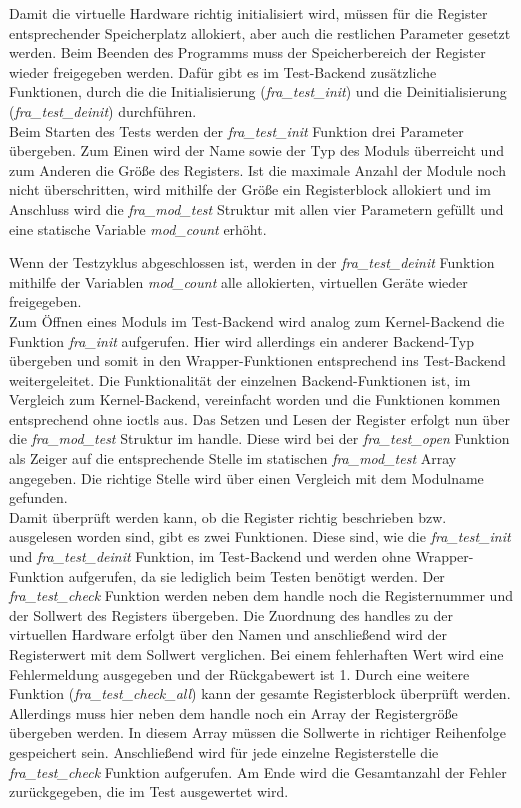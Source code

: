 Damit die virtuelle Hardware richtig initialisiert wird, müssen für die Register entsprechender Speicherplatz allokiert, aber auch die restlichen Parameter gesetzt werden. Beim Beenden des Programms muss der Speicherbereich der Register wieder freigegeben werden. Dafür gibt es im Test-Backend zusätzliche Funktionen, durch die die Initialisierung (\textit{fra\_test\_init}) und die Deinitialisierung (\textit{fra\_test\_deinit}) durchführen.\\

 
Beim Starten des Tests werden der \textit{fra\_test\_init} Funktion drei Parameter übergeben. Zum Einen wird der Name sowie der Typ des Moduls überreicht und zum Anderen die Größe des Registers. Ist die maximale Anzahl der Module noch nicht überschritten, wird mithilfe der Größe ein Registerblock allokiert und im Anschluss wird die \textit{fra\_mod\_test} Struktur mit allen vier Parametern gefüllt und eine statische Variable \textit{mod\_count} erhöht.

Wenn der Testzyklus abgeschlossen ist, werden in der \textit{fra\_test\_deinit} Funktion mithilfe der Variablen \textit{mod\_count} alle allokierten, virtuellen Geräte wieder freigegeben.\\


Zum Öffnen eines Moduls im Test-Backend wird analog zum Kernel-Backend die Funktion \textit{fra\_init} aufgerufen. Hier wird allerdings ein anderer Backend-Typ übergeben und somit in den Wrapper-Funktionen entsprechend ins Test-Backend weitergeleitet. 
Die Funktionalität der einzelnen Backend-Funktionen ist, im Vergleich zum Kernel-Backend, vereinfacht worden und die Funktionen kommen entsprechend ohne \ac{ioctl}s aus. Das Setzen und Lesen der Register erfolgt nun über die \textit{fra\_mod\_test} Struktur im \gls{handle}. Diese wird bei der \textit{fra\_test\_open} Funktion als Zeiger auf die entsprechende Stelle im statischen \textit{fra\_mod\_test} Array angegeben. Die richtige Stelle wird über einen Vergleich mit dem Modulname gefunden.\\



Damit überprüft werden kann, ob die Register richtig beschrieben bzw. ausgelesen worden sind, gibt es zwei Funktionen. Diese sind, wie die \textit{fra\_test\_init} und \textit{fra\_test\_deinit} Funktion, im Test-Backend und werden ohne Wrapper-Funktion aufgerufen, da sie lediglich beim Testen benötigt werden.
Der \textit{fra\_test\_check} Funktion werden neben dem \gls{handle} noch die Registernummer und der Sollwert des Registers übergeben. Die Zuordnung des \gls{handle}s zu der virtuellen Hardware erfolgt über den Namen und anschließend wird der Registerwert mit dem Sollwert verglichen. Bei einem fehlerhaften Wert wird eine Fehlermeldung ausgegeben und der Rückgabewert ist 1.
Durch eine weitere Funktion (\textit{fra\_test\_check\_all}) kann der gesamte Registerblock überprüft werden. Allerdings muss hier neben dem \gls{handle} noch ein Array der Registergröße übergeben werden. In diesem Array müssen die Sollwerte in richtiger Reihenfolge gespeichert sein. Anschließend wird für jede einzelne Registerstelle die \textit{fra\_test\_check} Funktion aufgerufen. Am Ende wird die Gesamtanzahl der Fehler zurückgegeben, die im Test ausgewertet wird.


